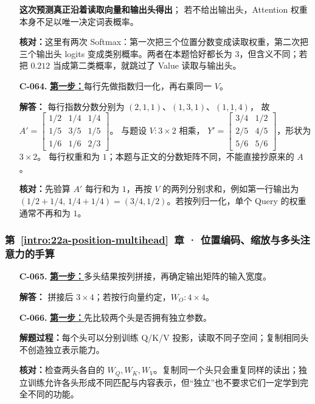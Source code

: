\begin{enumerate}[label={},leftmargin=4.8em,itemsep=4pt]
\textbf{这次预测真正沿着读取向量和输出头得出}；
若不给出输出头，Attention 权重本身不足以唯一决定词表概率。\par\textbf{核对：}这里有两次 Softmax：第一次把三个位置分数变成读取权重，第二次把三个输出头 logits 变成类别概率。两者在本题恰好都长为 $3$，但含义不同；若把 $0.212$ 当成第二类概率，就跳过了 Value 读取与输出头。
\item[\textbf{C-064.}] \leavevmode{}\label{solution:C-064}\label{solution:batch-softmax-recompute}\hyperref[exercise:batch-softmax-recompute]{\textbf{第一步：}}每行先做指数归一化，再右乘同一 $V$。\par\nobreak
\textbf{解答：} 每行指数分数分别为 $(2,1,1)$、$(1,3,1)$、$(1,1,4)$，
故 $A'=\boxed{\begin{bmatrix}
1/2&1/4&1/4\\
1/5&3/5&1/5\\
1/6&1/6&2/3
\end{bmatrix}}$。
与题设 $V:3\times2$ 相乘，
$Y'=\boxed{\begin{bmatrix}
3/4&1/2\\
2/5&4/5\\
5/6&5/6
\end{bmatrix}}$，形状为 $3\times2$。
每行权重和为 $1$；本题与正文的分数矩阵不同，不能直接抄原来的 $A$。\par\textbf{核对：}先验算 $A\prime$ 每行和为 $1$，再按 $V$ 的两列分别求和，例如第一行输出为 $(1/2+1/4,\,1/4+1/4)=(3/4,1/2)$。若按列归一化，单个 Query 的权重通常不再和为 $1$。
\end{enumerate}
\subsubsection*{第~\ref*{intro:22a-position-multihead}~章 · 位置编码、缩放与多头注意力的手算}
\begin{enumerate}[label={},leftmargin=4.8em,itemsep=4pt]
\item[\textbf{C-065.}] \leavevmode{}\label{solution:C-065}\label{solution:head-concatenation}\hyperref[exercise:head-concatenation]{\textbf{第一步：}}多头结果按列拼接，再确定输出矩阵的输入宽度。\par\nobreak
\textbf{解答：} 拼接后 $3\times4$；若按行向量约定，$W_O:4\times4$。
\item[\textbf{C-066.}] \leavevmode{}\label{solution:C-066}\label{solution:head-projection-diversity}\hyperref[exercise:head-projection-diversity]{\textbf{第一步：}}先比较两个头是否拥有独立参数。\par\nobreak\textbf{解题过程：}每个头可以分别训练 Q/K/V 投影，读取不同子空间；复制相同头不创造独立表示能力。\par\textbf{核对：}检查两头各自的 $W_Q,W_K,W_V$。复制同一个头只会重复同样的读出；独立训练允许各头形成不同匹配与内容表示，但“独立”也不要求它们一定学到完全不同的功能。
\end{enumerate}
